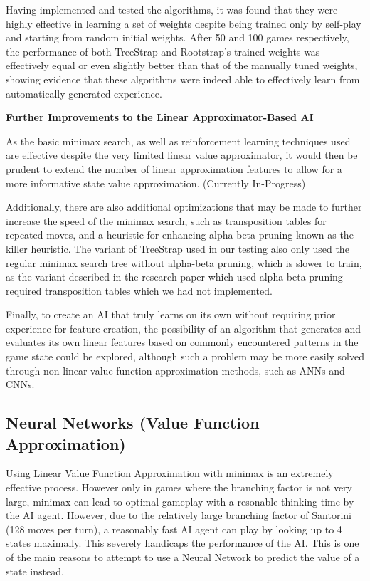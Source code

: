 \documentclass[a4paper,12pt,table]{article}
\begin{document}
Having implemented and tested the algorithms, it was found that they were highly effective in learning a set of weights despite being trained only by self-play and starting from random initial weights. After 50 and 100 games respectively, the performance of both TreeStrap and Rootstrap’s trained weights was effectively equal or even slightly better than that of the manually tuned weights, showing evidence that these algorithms were indeed able to effectively learn from automatically generated experience. \par

\textbf{Further Improvements to the Linear Approximator-Based AI}

As the basic minimax search, as well as reinforcement learning techniques used are effective despite the very limited linear value approximator, it would then be prudent to extend the number of linear approximation features to allow for a more informative state value approximation. (Currently In-Progress) \par

Additionally, there are also additional optimizations that may be made to further increase the speed of the minimax search, such as transposition tables for repeated moves, and a heuristic for enhancing alpha-beta pruning known as the killer heuristic. The variant of TreeStrap used in our testing also only used the regular minimax search tree without alpha-beta pruning, which is slower to train, as the variant described in the research paper which used alpha-beta pruning required transposition tables which we had not implemented. \par


Finally, to create an AI that truly learns on its own without requiring prior experience for feature creation, the possibility of an algorithm that generates and evaluates its own linear features based on commonly encountered patterns in the game state could be explored, although such a problem may be more easily solved through non-linear value function approximation methods, such as ANNs and CNNs. \par


\subsection{Neural Networks (Value Function Approximation)}

Using Linear Value Function Approximation with minimax is an extremely effective process. However only in games where the branching factor is not very large, minimax can lead to optimal gameplay with a resonable thinking time by the AI agent. However, due to the relatively large branching factor of Santorini (128 moves per turn), a reasonably fast AI agent can play by looking up to 4 states maximally. This severely handicaps the performance of the AI. This is one of the main reasons to attempt to use a Neural Network to predict the value of a state instead. \par
\end{document}
